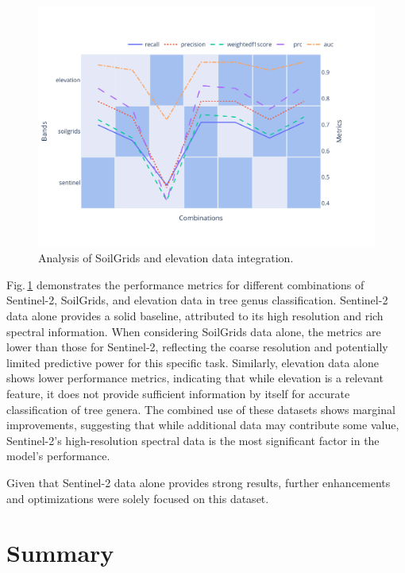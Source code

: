 \begin{figure}[ht]
    \centering
    \includegraphics[width=0.98\linewidth, trim={20pt 40pt 10pt 30pt}, clip]{figures/figures_analysis/soil_elevation_analysis.pdf}
    \caption{Analysis of SoilGrids and elevation data integration.}
    \label{fig:soil_elevation_analysis}
\end{figure}

Fig.\,\ref{fig:soil_elevation_analysis} demonstrates the performance metrics for different combinations of Sentinel-2, SoilGrids, and elevation data in tree genus classification. Sentinel-2 data alone provides a solid baseline, attributed to its high resolution and rich spectral information. When considering SoilGrids data alone, the metrics are lower than those for Sentinel-2, reflecting the coarse resolution and potentially limited predictive power for this specific task. Similarly, elevation data alone shows lower performance metrics, indicating that while elevation is a relevant feature, it does not provide sufficient information by itself for accurate classification of tree genera. The combined use of these datasets shows marginal improvements, suggesting that while additional data may contribute some value, Sentinel-2's high-resolution spectral data is the most significant factor in the model's performance.

Given that Sentinel-2 data alone provides strong results, further enhancements and optimizations were solely focused on this dataset. 

\section{Summary}

